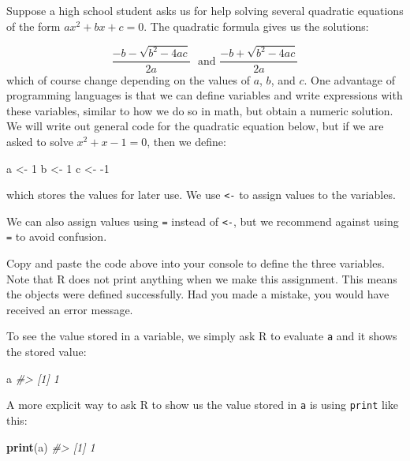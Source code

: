 \documentclass[
]{krantz}
\newenvironment{Shaded}{\begin{snugshade}}{\end{snugshade}}
\newcommand{\CommentTok}[1]{\textcolor[rgb]{0.37,0.37,0.37}{\textit{#1}}}
\newcommand{\DecValTok}[1]{\textcolor[rgb]{0.06,0.06,0.06}{#1}}
\newcommand{\KeywordTok}[1]{\textcolor[rgb]{0.27,0.27,0.27}{\textbf{#1}}}
\newcommand{\NormalTok}[1]{#1}
\newcommand{\StringTok}[1]{\textcolor[rgb]{0.5,0.5,0.5}{#1}}
\begin{document}
Suppose a high school student asks us for help solving several quadratic equations of the form \(ax^2+bx+c = 0\). The quadratic formula gives us the solutions:

\[
\frac{-b - \sqrt{b^2 - 4ac}}{2a}\,\, \mbox{ and } \frac{-b + \sqrt{b^2 - 4ac}}{2a}
\]
which of course change depending on the values of \(a\), \(b\), and \(c\). One advantage of programming languages is that we can define variables and write expressions with these variables, similar to how we do so in math, but obtain a numeric solution. We will write out general code for the quadratic equation below, but if we are asked to solve \(x^2 + x -1 = 0\), then we define:

\begin{Shaded}
\begin{Highlighting}[]
\NormalTok{a <-}\StringTok{ }\DecValTok{1}
\NormalTok{b <-}\StringTok{ }\DecValTok{1}
\NormalTok{c <-}\StringTok{ }\DecValTok{-1}
\end{Highlighting}
\end{Shaded}

which stores the values for later use. We use \texttt{\textless{}-} to assign values to the variables.

We can also assign values using \texttt{=} instead of \texttt{\textless{}-}, but we recommend against using \texttt{=} to avoid confusion.

Copy and paste the code above into your console to define the three variables. Note that R does not print anything when we make this assignment. This means the objects were defined successfully. Had you made a mistake, you would have received an error message.

To see the value stored in a variable, we simply ask R to evaluate \texttt{a} and it shows the stored value:

\begin{Shaded}
\begin{Highlighting}[]
\NormalTok{a}
\CommentTok{#> [1] 1}
\end{Highlighting}
\end{Shaded}

A more explicit way to ask R to show us the value stored in \texttt{a} is using \texttt{print} like this:

\begin{Shaded}
\begin{Highlighting}[]
\KeywordTok{print}\NormalTok{(a)}
\CommentTok{#> [1] 1}
\end{Highlighting}
\end{Shaded}
\end{document}
